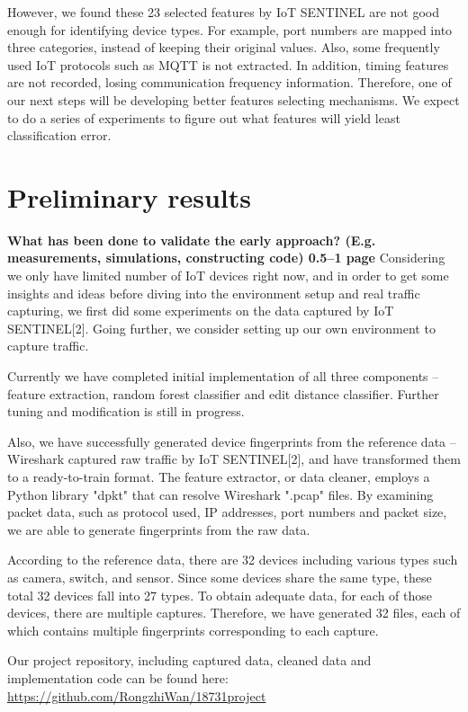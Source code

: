 \documentclass[twocolumn,10pt]{article}
\begin{document}
However, we found these 23 selected features by IoT SENTINEL are not good enough for identifying device types. For example, port numbers are mapped into three categories, instead of keeping their original values. Also, some frequently used IoT protocols such as MQTT is not extracted. In addition, timing features are not recorded, losing communication frequency information. Therefore, one of our next steps will be developing better features selecting mechanisms. We expect to do a series of experiments to figure out what features will yield least classification error.

\section{Preliminary results}

{\bf What has been done to validate the early approach? (E.g.
measurements, simulations, constructing code)  0.5--1 page}
Considering we only have limited number of IoT devices right now, and in order to get some insights and ideas before diving into the environment setup and real traffic capturing, we first did some experiments on the data captured by IoT SENTINEL[2]. Going further, we consider setting up our own environment to capture traffic. 

Currently we have completed initial implementation of all three components -- feature extraction, random forest classifier and edit distance classifier. Further tuning and modification is still in progress. 

Also, we have successfully generated device fingerprints from the reference data -- Wireshark captured raw traffic by IoT SENTINEL[2], and have transformed them to a ready-to-train format. The feature extractor, or data cleaner, employs a Python library "dpkt" that can resolve Wireshark ".pcap" files. By examining packet data, such as protocol used, IP addresses, port numbers and packet size, we are able to generate fingerprints from the raw data.

According to the reference data, there are 32 devices including various types such as camera, switch, and sensor. Since some devices share the same type, these total 32 devices fall into 27 types. To obtain adequate data, for each of those devices, there are multiple captures. Therefore, we have generated 32 files, each of which contains multiple fingerprints corresponding to each capture.

Our project repository, including captured data, cleaned data and implementation code can be found here:  
\url{https://github.com/RongzhiWan/18731project}
\end{document}
